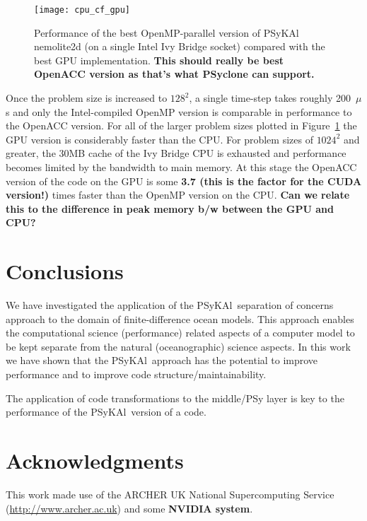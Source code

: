\documentclass[journal]{IEEEtran}
\newcommand{\psykal}{{PS}y{KA}l\ }
\begin{document}
\begin{figure}
\centering
\texttt{[image: cpu\_cf\_gpu]}
\caption{Performance of the best OpenMP-parallel version of \psykal
  nemolite2d (on a single Intel Ivy Bridge socket) compared with the best GPU implementation. {\bf This should really be best OpenACC version as that's what PSyclone can support.}}
\label{FIG_cpu_cf_gpu}
\end{figure}

Once the problem size is increased to $128^2$, a single time-step
takes roughly 200~$\mu$s and only the Intel-compiled OpenMP version is
comparable in performance to the OpenACC version. For all of the
larger problem sizes plotted in Figure~\ref{FIG_cpu_cf_gpu} the GPU
version is considerably faster than the CPU.  For problem sizes of
$1024^2$ and greater, the 30MB cache of the Ivy Bridge CPU is
exhausted and performance becomes limited by the bandwidth to main
memory. At this stage the OpenACC version of the code on the GPU is
some {\bf 3.7 (this is the factor for the CUDA version!)} times faster
than the OpenMP version on the CPU. {\bf Can we relate this to the
  difference in peak memory b/w between the GPU and CPU?}

\section{Conclusions}

We have investigated the application of the \psykal separation of
concerns approach to the domain of finite-difference ocean
models. This approach enables the computational science (performance)
related aspects of a computer model to be kept separate from the
natural (oceanographic) science aspects. In this work we have shown
that the \psykal approach has the potential to improve performance and
to improve code structure/maintainability.

The application of code transformations to the middle/PSy layer is key
to the performance of the \psykal version of a code.




\section*{Acknowledgments}

This work made use of the ARCHER UK National Supercomputing Service
(\url{http://www.archer.ac.uk}) and some {\bf NVIDIA system}.
\end{document}
